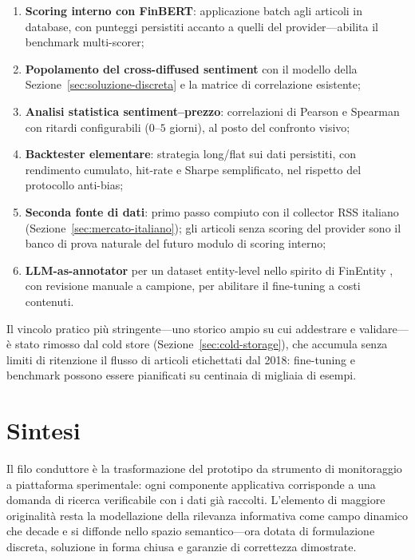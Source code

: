 \begin{enumerate}
  \item \textbf{Scoring interno con FinBERT}: applicazione batch agli articoli in database, con punteggi persistiti accanto a quelli del provider---abilita il benchmark multi-scorer;
  \item \textbf{Popolamento del cross-diffused sentiment} con il modello della Sezione~\ref{sec:soluzione-discreta} e la matrice di correlazione esistente;
  \item \textbf{Analisi statistica sentiment--prezzo}: correlazioni di Pearson e Spearman con ritardi configurabili ($0$--$5$ giorni), al posto del confronto visivo;
  \item \textbf{Backtester elementare}: strategia long/flat sui dati persistiti, con rendimento cumulato, hit-rate e Sharpe semplificato, nel rispetto del protocollo anti-bias;
  \item \textbf{Seconda fonte di dati}: primo passo compiuto con il collector RSS italiano (Sezione~\ref{sec:mercato-italiano}); gli articoli senza scoring del provider sono il banco di prova naturale del futuro modulo di scoring interno;
  \item \textbf{LLM-as-annotator} per un dataset entity-level nello spirito di FinEntity \parencite{tang-etal-2023-finentity}, con revisione manuale a campione, per abilitare il fine-tuning a costi contenuti.
\end{enumerate}

Il vincolo pratico più stringente---uno storico ampio su cui addestrare e validare---è stato rimosso dal cold store (Sezione~\ref{sec:cold-storage}), che accumula senza limiti di ritenzione il flusso di articoli etichettati dal 2018: fine-tuning e benchmark possono essere pianificati su centinaia di migliaia di esempi.

\section{Sintesi}

Il filo conduttore è la trasformazione del prototipo da strumento di monitoraggio a piattaforma sperimentale: ogni componente applicativa corrisponde a una domanda di ricerca verificabile con i dati già raccolti.
L'elemento di maggiore originalità resta la modellazione della rilevanza informativa come campo dinamico che decade e si diffonde nello spazio semantico---ora dotata di formulazione discreta, soluzione in forma chiusa e garanzie di correttezza dimostrate.
